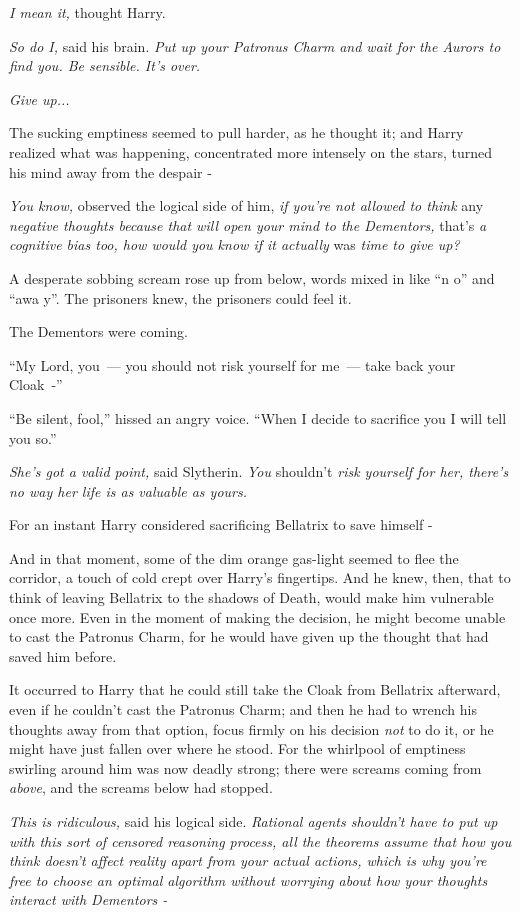 \emph{I mean it,} thought Harry.

\emph{So do I,} said his brain. \emph{Put up your Patronus Charm and wait for the Aurors to find you. Be sensible. It's over.}

\emph{Give up...}

The sucking emptiness seemed to pull harder, as he thought it; and Harry realized what was happening, concentrated more intensely on the stars, turned his mind away from the despair -

\emph{You know,} observed the logical side of him, \emph{if you're not allowed to think} any \emph{negative thoughts because that will open your mind to the Dementors,} that's \emph{a cognitive bias too, how would you know if it actually} was \emph{time to give up?}

A desperate sobbing scream rose up from below, words mixed in like ``n o'' and ``awa y''. The prisoners knew, the prisoners could feel it.

The Dementors were coming.

``My Lord, you~--- you should not risk yourself for me~--- take back your Cloak~-''

``Be silent, fool,'' hissed an angry voice. ``When I decide to sacrifice you I will tell you so.''

\emph{She's got a valid point,} said Slytherin. \emph{You} shouldn't \emph{risk yourself for her, there's no way her life is as valuable as yours.}

For an instant Harry considered sacrificing Bellatrix to save himself -

And in that moment, some of the dim orange gas-light seemed to flee the corridor, a touch of cold crept over Harry's fingertips. And he knew, then, that to think of leaving Bellatrix to the shadows of Death, would make him vulnerable once more. Even in the moment of making the decision, he might become unable to cast the Patronus Charm, for he would have given up the thought that had saved him before.

It occurred to Harry that he could still take the Cloak from Bellatrix afterward, even if he couldn't cast the Patronus Charm; and then he had to wrench his thoughts away from that option, focus firmly on his decision \emph{not} to do it, or he might have just fallen over where he stood. For the whirlpool of emptiness swirling around him was now deadly strong; there were screams coming from \emph{above}, and the screams below had stopped.

\emph{This is ridiculous,} said his logical side. \emph{Rational agents shouldn't have to put up with this sort of censored reasoning process, all the theorems assume that how you think doesn't affect reality apart from your actual actions, which is why you're free to choose an optimal algorithm without worrying about how your thoughts interact with Dementors -}

